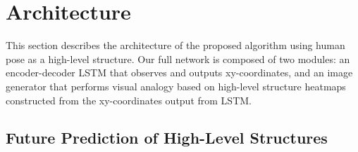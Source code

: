 \documentclass{article}
\newcommand{\cutsectionup}{\vspace*{-0.1in}}
\newcommand{\cutsectiondown}{\vspace*{-0.05in}}
\newcommand{\cutsubsectionup}{\vspace*{-0.09in}}
\newcommand{\cutsubsectiondown}{\vspace*{-0.04in}}
\newcommand{\cutsectionup}{}
\newcommand{\cutsectiondown}{}
\newcommand{\cutsubsectionup}{}
\newcommand{\cutsubsectiondown}{}
\begin{document}
\cutsectionup\section{Architecture}\label{sec:architecture}\cutsectiondown%
This section describes the architecture of the proposed algorithm using human pose as a high-level structure.
Our full network is composed of two modules: an encoder-decoder LSTM that observes and outputs xy-coordinates, and an image generator that performs visual analogy based on high-level structure heatmaps constructed from the xy-coordinates output from LSTM.

\cutsubsectionup\subsection{Future Prediction of High-Level Structures}%
\end{document}

